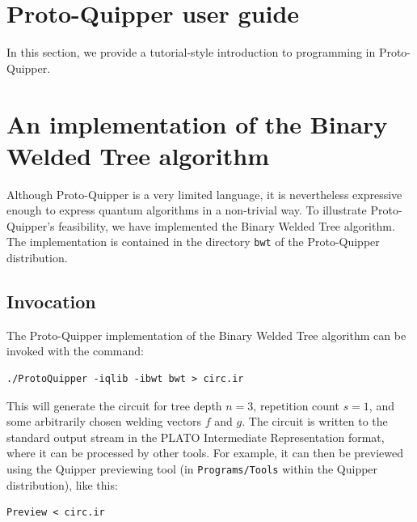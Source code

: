 \documentclass[twoside]{article}
\begin{document}
\clearpage
\section{Proto-Quipper user guide}
\label{sec-user-guide}

In this section, we provide a tutorial-style introduction to 
programming in Proto-Quipper. 



\clearpage
\section{An implementation of the Binary Welded Tree algorithm}
\label{sec-bwt}

Although Proto-Quipper is a very limited language, it is nevertheless
expressive enough to express quantum algorithms in a non-trivial way.
To illustrate Proto-Quipper's feasibility, we have implemented the
Binary Welded Tree algorithm. The implementation is contained in the
directory \verb!bwt! of the Proto-Quipper distribution.

\subsection{Invocation}

The Proto-Quipper implementation of the Binary Welded Tree algorithm
can be invoked with the command:

\begin{code}
\begin{verbatim}
./ProtoQuipper -iqlib -ibwt bwt > circ.ir
\end{verbatim}
\end{code}

This will generate the circuit for tree depth $n=3$, repetition count
$s=1$, and some arbitrarily chosen welding vectors $f$ and $g$. The
circuit is written to the standard output stream in the PLATO
Intermediate Representation format, where it can be processed by other
tools. For example, it can then be previewed using the Quipper
previewing tool (in \verb!Programs/Tools! within the Quipper
distribution), like this:

\begin{code}
\begin{verbatim}
Preview < circ.ir
\end{verbatim}
\end{code}
\end{document}
